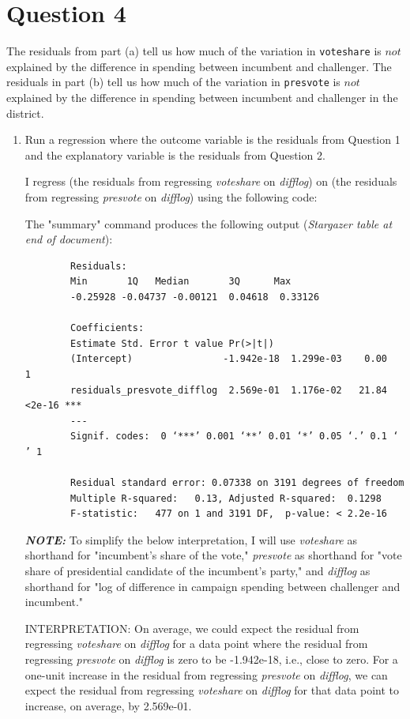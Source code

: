 \documentclass[12pt,letterpaper]{article}
\begin{document}
\section*{Question 4}
\noindent The residuals from part (a) tell us how much of the variation in \texttt{voteshare} is $not$ explained by the difference in spending between incumbent and challenger. The residuals in part (b) tell us how much of the variation in \texttt{presvote} is $not$ explained by the difference in spending between incumbent and challenger in the district.
	\begin{enumerate}
		\item Run a regression where the outcome variable is the residuals from Question 1 and the explanatory variable is the residuals from Question 2.	\vspace{.5cm}
		
		I regress (the residuals from regressing \textit{voteshare} on \textit{difflog}) on (the residuals from regressing \textit{presvote} on \textit{difflog}) using the following code:
		
				
				
		The "summary" command produces the following output (\textit{Stargazer table at end of document}):
		
			\begin{verbatim}
		Residuals:
		Min       1Q   Median       3Q      Max 
		-0.25928 -0.04737 -0.00121  0.04618  0.33126 
		
		Coefficients:
		Estimate Std. Error t value Pr(>|t|)    
		(Intercept)                -1.942e-18  1.299e-03    0.00        1    
		residuals_presvote_difflog  2.569e-01  1.176e-02   21.84   <2e-16 ***
		---
		Signif. codes:  0 ‘***’ 0.001 ‘**’ 0.01 ‘*’ 0.05 ‘.’ 0.1 ‘ ’ 1
		
		Residual standard error: 0.07338 on 3191 degrees of freedom
		Multiple R-squared:   0.13,	Adjusted R-squared:  0.1298 
		F-statistic:   477 on 1 and 3191 DF,  p-value: < 2.2e-16
		\end{verbatim}
		
			\textbf{\textit{NOTE: }}To simplify the below interpretation, I will use \textit{voteshare} as shorthand for "incumbent's share of the vote," \textit{presvote} as shorthand for "vote share of presidential candidate of the incumbent's party," and \textit{difflog} as shorthand for "log of difference in campaign spending between challenger and incumbent."
		
		\vspace{.5cm} INTERPRETATION: On average, we could expect the residual from regressing \textit{voteshare} on \textit{difflog} for a data point where the residual from regressing \textit{presvote} on \textit{difflog} is zero to be -1.942e-18, i.e., close to zero. For a one-unit increase in the residual from regressing \textit{presvote} on \textit{difflog}, we can expect the residual from regressing \textit{voteshare} on \textit{difflog} for that data point to increase, on average, by 2.569e-01. \vspace{.5cm}
		

\end{enumerate}
\end{document}
